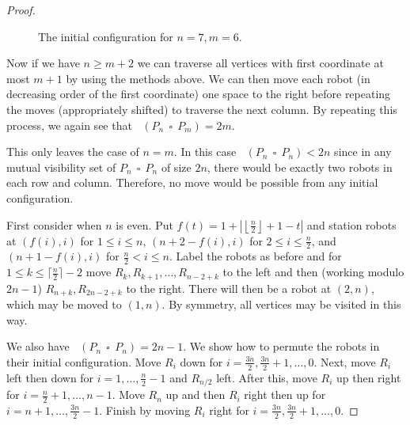 \documentclass[a4paper,12pt]{article}
\DeclareMathOperator{\mobmv}{Mob_{\mu}}
\DeclareMathOperator{\cmobmv}{Mob^*_{\mu}}
\DeclareMathOperator{\cp}{\,\square\,}
\theoremstyle{definition}
\begin{document}
\begin{proof}
\begin{figure}[h]
			\caption[justification=centering]{The initial configuration for $n = 7, m = 6$.}
			\label{fig:a6r1initial}
			
		\end{figure}
		
		Now if we have $n \geq m+2$ we can traverse all vertices with first coordinate at most $m+1$ by using the methods above. We can then move each robot (in decreasing order of the first coordinate) one space to the right before repeating the moves (appropriately shifted) to traverse the next column. By repeating this process, we again see that $\mobmv(P_{n} \cp P_m) = 2m$.
		
		This only leaves the case of $n = m$. In this case $\mobmv(P_n \cp P_n) < 2n$ since in any mutual visibility set of $P_n \cp P_n$ of size $2n$, there would be exactly two robots in each row and column. Therefore, no move would be possible from any initial configuration. 
		
		First consider when $n$ is even. Put $f(t) = 1 + |\left \lfloor \frac{n}{2} \right \rfloor + 1 - t|$ and station robots at $(f(i), i)$ for $1 \leq i \leq n$, $(n+2-f(i), i)$ for $2 \leq i \leq \frac{n}{2}$, and $(n+1-f(i),i)$ for $\frac{n}{2} < i \leq n$. Label the robots as before and for $1 \leq k \leq \lceil \frac{n}{2} \rceil - 2$ move $R_k, R_{k+1}, \dots, R_{n-2+k}$ to the left and then (working modulo $2n-1$) $R_{n+k}, R_{2n-2+k}$ to the right. There will then be a robot at $(2,n)$, which may be moved to $(1,n)$. By symmetry, all vertices may be visited in this way.
		
		We also have $\cmobmv(P_n \cp P_n) = 2n-1$. We show how to permute the robots in their initial configuration. Move $R_i$ down for $i=\frac{3n}{2}, \frac{3n}{2} + 1, \dots, 0$. Next, move $R_i$ left then down for $i=1,\dots,\frac{n}{2} - 1$ and $R_{n/2}$ left. After this, move $R_i$ up then right for $i=\frac{n}{2} + 1, \dots, n - 1$. Move $R_n$ up and then $R_i$ right then up for $i=n+1, \dots, \frac{3n}{2} - 1$. Finish by moving $R_i$ right for $i=\frac{3n}{2}, \frac{3n}{2} + 1, \dots, 0$.
		

\end{proof}
\end{document}
